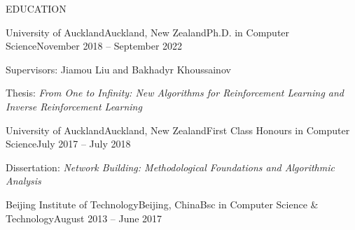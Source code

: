 \documentclass{resume} %
\begin{document}

\begin{rSection}{EDUCATION}

\begin{rSubsection}{University of Auckland}{Auckland, New Zealand}{Ph.D. in Computer Science}{November 2018 -- September 2022}%
\item Supervisors: Jiamou Liu and Bakhadyr Khoussainov
\item Thesis: {\em From One to Infinity: New Algorithms for Reinforcement Learning and Inverse Reinforcement Learning}
\end{rSubsection}

\begin{rSubsection}{University of Auckland}{Auckland, New Zealand}{First Class Honours in Computer Science}{July 2017 -- July 2018}
\item Dissertation: {\em Network Building: Methodological Foundations and Algorithmic Analysis}
\end{rSubsection}

\begin{rSubsection}{Beijing Institute of Technology}{Beijing, China}{Bsc in Computer Science \& Technology}{August 2013 -- June 2017}
\end{rSubsection}
\end{rSection}
\end{document}
